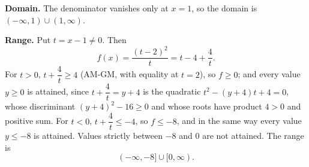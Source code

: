 \textbf{Domain.} The denominator vanishes only at $x=1$, so the domain is $\boxed{(-\infty,1)\cup(1,\infty)}$.

\textbf{Range.} Put $t=x-1\ne0$. Then
\[f(x)=\dfrac{(t-2)^2}{t}=t-4+\dfrac4t.\]
For $t>0$, $t+\dfrac4t\ge4$ (AM-GM, with equality at $t=2$), so $f\ge0$; and every value $y\ge0$ is attained, since $t+\dfrac4t=y+4$ is the quadratic $t^2-(y+4)t+4=0$, whose discriminant $(y+4)^2-16\ge0$ and whose roots have product $4>0$ and positive sum. For $t<0$, $t+\dfrac4t\le-4$, so $f\le-8$, and in the same way every value $y\le-8$ is attained. Values strictly between $-8$ and $0$ are not attained. The range is
\[\boxed{(-\infty,-8]\cup[0,\infty)}.\]
